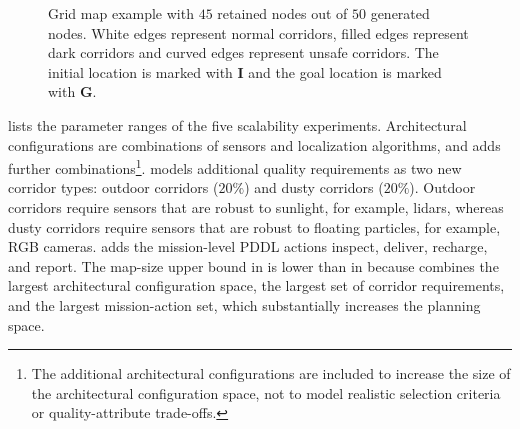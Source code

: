 \begin{figure}[tbp]
    \centering
    \resizebox{0.5\textwidth}{!}{
        
    }
    \caption{Grid map example with $45$ retained nodes out of $50$ generated nodes.
    White edges represent normal corridors, filled edges represent dark corridors and curved edges represent unsafe corridors. The initial location is marked with {\sffamily\bfseries I} and the goal location is marked with {\sffamily\bfseries G}.
    }%
    \label{planta:fig:grid_map_example}
\end{figure}

 lists the parameter ranges of the five scalability experiments. Architectural configurations are combinations of sensors and localization algorithms, and \Stwo adds further combinations\footnote{The additional architectural configurations are included to increase the size of the architectural configuration space, not to model realistic selection criteria or quality-attribute trade-offs.}. \Sthree models additional quality requirements as two new corridor types: outdoor corridors ($20\%$) and dusty corridors ($20\%$). Outdoor corridors require sensors that are robust to sunlight, for example, lidars, whereas dusty corridors require sensors that are robust to floating particles, for example, RGB cameras. \Sfour adds the mission-level PDDL actions inspect, deliver, recharge, and report. The map-size upper bound in \Sfive is lower than in \Sone because \Sfive combines the largest architectural configuration space, the largest set of corridor requirements, and the largest mission-action set, which substantially increases the planning space.

